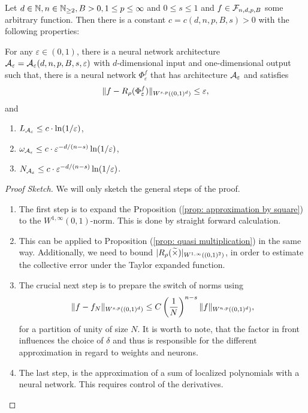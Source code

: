 \begin{theorem} \label{theo: gühring}
    Let $d \in \mathbb{N}, n \in \mathbb{N}_{\geq 2}, B > 0, 1 \leq p \leq \infty$ 
    and $0 \leq s \leq 1$ and $f \in \mathcal{F}_{n ,d , p, B}$ some arbitrary function.
    Then there is a constant $c = c(d, n, p, B, s) > 0$ with the following properties:
    
    For any $\varepsilon \in (0, 1)$, there is a neural network architecture 
    $\mathcal{A}_\varepsilon = \mathcal{A}_\varepsilon(d, n, p, B, s, \varepsilon)$ with $d$-dimensional input and one-dimensional output such
    that, there is a neural network $\Phi_\varepsilon^f$ that has architecture $\mathcal{A}_\varepsilon$ and satisfies
    \begin{equation*}
        \snorm{f - R_\rho(\Phi_\varepsilon^f)}[s][p][d] \leq \varepsilon,
    \end{equation*}
    and
    \begin{enumerate}
        \item $L_{\mathcal{A}_\varepsilon} \leq c \cdot \ln(1 / \varepsilon)$,
        \item $\omega_{\mathcal{A}_\varepsilon} \leq c \cdot \varepsilon^{-d/(n-s)} \ln(1/\varepsilon)$,
        \item $N_{\mathcal{A}_\varepsilon} \leq c \cdot \varepsilon^{-d/(n-s)} \ln(1/\varepsilon)$.
    \end{enumerate}
\end{theorem}
\begin{proof}[Proof Sketch]
    We will only sketch the general steps of the proof.
    \begin{enumerate}
        \item The first step is to expand the Proposition (\ref{prop: approximation by square}) to the 
        $W^{1, \infty}(0,1)$-norm. This is done by straight forward calculation.
        \item This can be applied to Proposition (\ref{prop: quasi multiplication}) in the same way. Additionally,
        we need to bound $\lvert R_\rho(\widetilde{\times}) \rvert_{W^{1, \infty}((0,1)^2)}$, in order to
        estimate the collective error under the Taylor expanded function.
        \item The crucial next step is to prepare the switch of norms using
        \begin{equation*}
            \snorm{f - f_N}[s][p][d] \leq C \left( \frac{1}{N} \right)^{n-s} \snorm{f}[n][p][d],
        \end{equation*}
        for a partition of unity of size $N$. It is worth to note, that the factor in front influences
        the choice of $\delta$ and thus is responsible for the
        different approximation in regard to weights and neurons.
        \item The last step, is
        the approximation of a sum of localized polynomials with a neural network. This requires control of the derivatives.
    \end{enumerate}
\end{proof}




